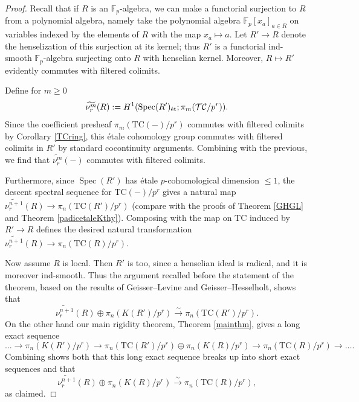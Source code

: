 \documentclass{amsart}
\theoremstyle{definition}
\newcommand{\sub}[1]{{\mbox{\rm \scriptsize #1}}}
\newcommand{\TC}{\mathrm{TC}}
\begin{document}
\begin{proof}
Recall that if $R$ is an $\mathbb{F}_p$-algebra, we can make a functorial surjection to $R$ from a polynomial algebra, namely take the polynomial algebra $\mathbb{F}_p[x_a]_{a\in R}$ on variables indexed by the elements of $R$ with the map $x_a\mapsto a$.  Let $R'\rightarrow R$ denote the henselization of this surjection at its kernel; thus $R'$ is a functorial ind-smooth $\mathbb{F}_p$-algebra surjecting onto $R$ with henselian kernel.  Moreover, $R\mapsto R'$ evidently commutes with filtered colimits.

Define
for $m \geq 0$
$$\widetilde{\nu^m_r}(R) := H^1(\operatorname{Spec}(R')_\sub{\'{e}t};\pi_{m}(\mathcal{TC}/p^r)).$$
Since the coefficient presheaf $\pi_{m}(\TC(-)/p^r)$ commutes with filtered
colimits by Corollary \ref{TCring}, this \'etale cohomology group commutes with filtered colimits in $R'$ by standard cocontinuity arguments.  Combining with the previous, we find that $\widetilde{\nu^m_r}(-)$ commutes with filtered colimits.

Furthermore, since $\operatorname{Spec}(R')$ has \'{e}tale $p$-cohomological dimension $\leq 1$, the descent spectral sequence for $\TC(-)/p^r$ gives a natural map $\widetilde{\nu^{n+1}_r}(R)\rightarrow \pi_n(\TC(R')/p^r)$ (compare with the proofs of Theorem \ref{GHGL} and Theorem \ref{padicetaleKthy}).  Composing with the map on $\TC$ induced by $R'\rightarrow R$ defines the desired natural transformation $\widetilde{\nu^{n+1}_r}(R)\rightarrow \pi_n(\TC(R)/p^r)$.

Now assume $R$ is local.  Then $R'$ is too, since a henselian ideal is radical, and it is moreover ind-smooth.  Thus the argument recalled before the statement of the theorem, based on the results of Geisser--Levine and Geisser--Hesselholt, shows that
$$\widetilde{\nu^{n+1}_r}(R)\oplus \pi_n(K(R')/p^r)\overset{\sim}{\rightarrow}\pi_n(\TC(R')/p^r).$$
On the other hand our main rigidity theorem, Theorem \ref{mainthm}, gives a long exact sequence
$$\ldots\rightarrow\pi_n(K(R')/p^r)\rightarrow \pi_n(\TC(R')/p^r)\oplus \pi_n(K(R)/p^r)\rightarrow \pi_n(\TC(R)/p^r)\rightarrow\ldots.$$
Combining shows both that this long exact sequence breaks up into short exact sequences and that 
$$\widetilde{\nu^{n+1}_r}(R)\oplus\pi_n(K(R)/p^r)\overset{\sim}{\rightarrow}\pi_n(\TC(R)/p^r),$$
as claimed.
\end{proof}
\end{document}
